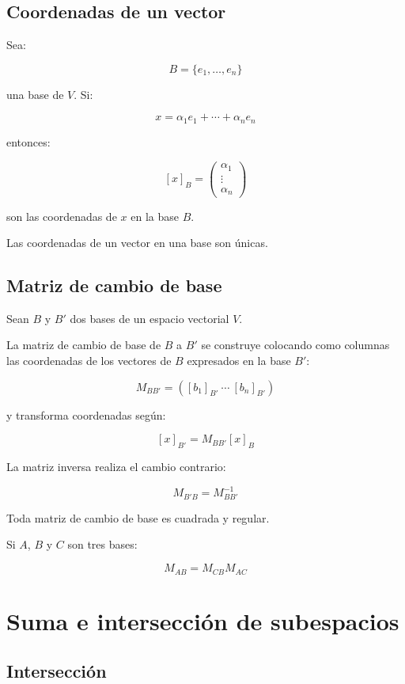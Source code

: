 \documentclass[11pt,a4paper]{article}
\begin{document}
\subsection{Coordenadas de un vector}

Sea:

\[
B=\{e_1,\ldots,e_n\}
\]

una base de $V$. Si:

\[
x=
\alpha_1e_1+\cdots+\alpha_ne_n
\]

entonces:

\[
[x]_B=
\begin{pmatrix}
\alpha_1\\
\vdots\\
\alpha_n
\end{pmatrix}
\]

son las coordenadas de $x$ en la base $B$.

Las coordenadas de un vector en una base son únicas.

\subsection{Matriz de cambio de base}

Sean $B$ y $B'$ dos bases de un espacio vectorial $V$.

La matriz de cambio de base de $B$ a $B'$ se construye colocando como columnas las coordenadas de los vectores de $B$ expresados en la base $B'$:

\[
\boxed{
M_{BB'}
=
\left(
[b_1]_{B'}
\ \cdots\
[b_n]_{B'}
\right)
}
\]

y transforma coordenadas según:

\[
\boxed{
[x]_{B'}
=
M_{BB'}[x]_B
}
\]

La matriz inversa realiza el cambio contrario:

\[
M_{B'B}
=
M_{BB'}^{-1}
\]

Toda matriz de cambio de base es cuadrada y regular.

Si $A$, $B$ y $C$ son tres bases:

\[
\boxed{
M_{AB}
=
M_{CB}M_{AC}
}
\]

\section{Suma e intersección de subespacios}

\subsection{Intersección}
\end{document}
